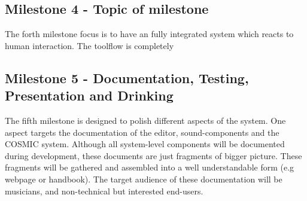 	
	
\subsection{Milestone 4 - Topic of milestone}

The forth milestone focus is to have an fully integrated system which reacts to human interaction. The toolflow is completely

\subsection{Milestone 5 - Documentation, Testing, Presentation and Drinking}

The fifth milestone is designed to polish different aspects of the system. One aspect targets the documentation of the editor, sound-components and the COSMIC system. Although all system-level components will be documented during development, these documents are just fragments of bigger picture. These fragments will be gathered and assembled into a well understandable form (e.g webpage or handbook). The target audience of these documentation will be musicians, and non-technical but interested end-users.  